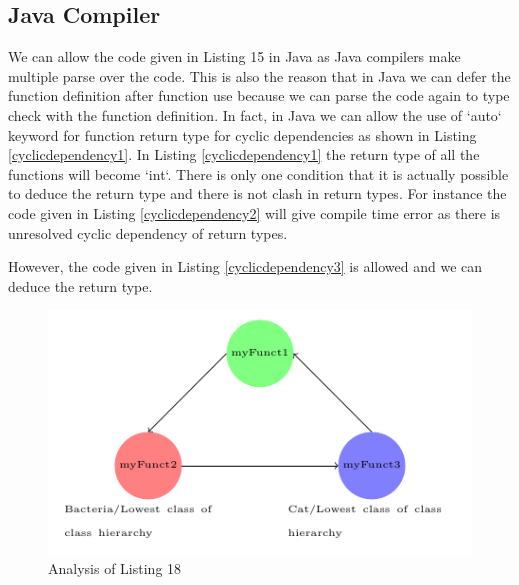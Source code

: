 \subsection{Java Compiler}
We can allow the code given in Listing 15 in Java as Java compilers make multiple parse over the code. This is also the reason that in Java we can defer the function definition after function use because we can parse the code again to type check with the function definition. 
In fact, in Java we can allow the use of `auto` keyword for function return type for cyclic dependencies as shown in Listing \ref{cyclicdependency1}. In Listing \ref{cyclicdependency1} the return type of all the functions will become `int`.
There is only one condition that it is actually possible to deduce the return type and there is not clash in return types. For instance the code given in Listing \ref{cyclicdependency2} will give compile time error as there is unresolved cyclic dependency of return types.

However, the code given in Listing \ref{cyclicdependency3} is allowed and we can deduce the return type. 

\begin{figure}
\centering
\includegraphics[width = 15cm]{diagram4.pdf}
\caption{Analysis of Listing 18}
\end{figure}